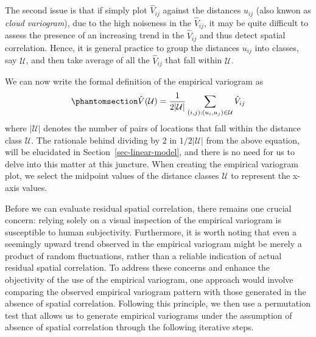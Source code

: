 \documentclass[
  letterpaper,
]{krantz}
\begin{document}
The second issue is that if simply plot \(\hat{V}_{ij}\) against the
distances \(u_{ij}\) (also knwon as \emph{cloud variogram}), due to the
high noiseness in the \(\hat{V}_{ij}\), it may be quite difficult to
assess the presence of an increasing trend in the \(\hat{V}_{ij}\) and
thus detect spatial correlation. Hence, it is general practice to group
the distances \(u_{ij}\) into classes, say \(\mathcal{U}\), and then
take average of all the \(\hat{V}_{ij}\) that fall within
\(\mathcal{U}\).

We can now write the formal definition of the empirical variogram as
\begin{equation}\phantomsection\label{eq-empirical-variogram}{
\hat{V}(\mathcal{U}) = \frac{1}{2 |\mathcal{U}|} \sum_{(i, j): (u_i, u_j) \in \mathcal{U}} \hat{V}_{ij}
}\end{equation} where \(|\mathcal{U}|\) denotes the number of pairs of
locations that fall within the distance class \(\mathcal{U}\). The
rationale behind dividing by 2 in \(1/2 |\mathcal{U}|\) from the above
equation, will be elucidated in Section~\ref{sec-linear-model}, and
there is no need for us to delve into this matter at this juncture. When
creating the empirical variogram plot, we select the midpoint values of
the distance classes \(\mathcal{U}\) to represent the x-axis values.

Before we can evaluate residual spatial correlation, there remains one
crucial concern: relying solely on a visual inspection of the empirical
variogram is susceptible to human subjectivity. Furthermore, it is worth
noting that even a seemingly upward trend observed in the empirical
variogram might be merely a product of random fluctuations, rather than
a reliable indication of actual residual spatial correlation. To address
these concerns and enhance the objectivity of the use of the empirical
variogram, one approach would involve comparing the observed empirical
variogram pattern with those generated in the absence of spatial
correlation. Following this principle, we then use a permutation test
that allows us to generate empirical variograms under the assumption of
absence of spatial correlation through the following iterative steps.
\end{document}
